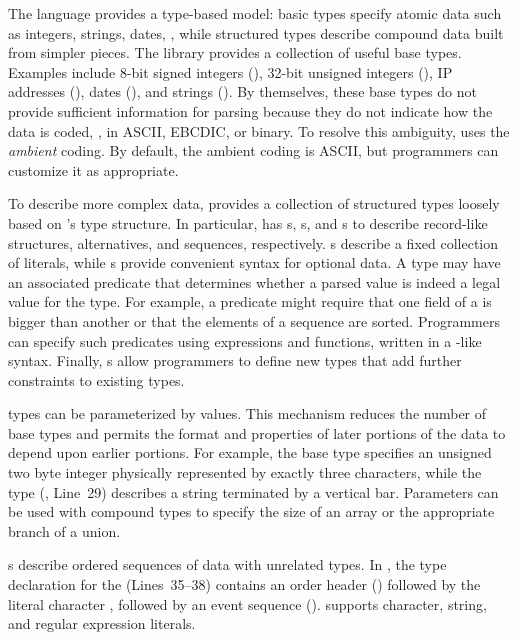 The language provides a type-based model:
basic types specify atomic data such as integers, strings, dates, \etc{}, while
structured types describe compound data built from simpler pieces.
The \pads{} library provides a collection of useful base types.
Examples include
8-bit signed integers (),
32-bit unsigned integers (),
IP addresses (), 
dates (), and strings ().
By themselves, these base types do not provide sufficient information for parsing
because they do not indicate how the data is coded, \ie{}, in ASCII, EBCDIC, or binary.  
To resolve this ambiguity, \pads{} uses the \textit{ambient} coding.
By default, the ambient coding is ASCII, but programmers can customize
it as appropriate.

To describe more complex data, \pads{} provides a collection of 
structured types loosely based on \C{}'s type structure.
In particular, \pads{} has 
s, s, and s to describe
record-like structures, alternatives, and sequences, respectively.
s describe a fixed collection of literals, while s 
provide convenient syntax for optional data.
A type may have an associated predicate that determines
whether a parsed value is indeed a legal
value for the type.  For example, a predicate might require that one
field of a  is bigger than another or that the elements
of a sequence are sorted.  Programmers can specify such
predicates using \pads{} expressions and functions, 
written in a \C{}-like syntax.
Finally, \pads{} s allow programmers
to define new types that add further constraints to existing types.

\pads{} types can be parameterized by values.
This mechanism reduces the number of base types and  permits the
format and properties of later portions of the data to depend upon earlier portions.
For example, 
the base type  specifies an unsigned two byte integer
physically represented by exactly three characters, while the type
  (\eg{}, Line~29)
describes a string terminated by a vertical bar.  Parameters can be 
used with compound types to specify the size of an array or the
appropriate branch of a union.

s describe ordered sequences of data with unrelated types.
In , the type declaration for the 
 (Lines~35--38)
contains an order header
() followed by the literal character ,
followed by an event sequence ().  \pads{} supports
character, string, and regular expression literals.

